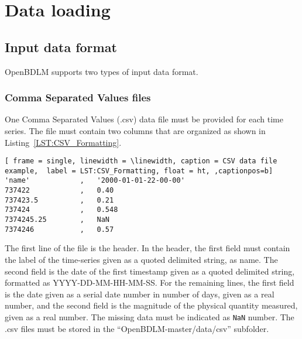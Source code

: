 \section{Data loading}
\label{S:DATALOADING}
\subsection{Input data format}

OpenBDLM supports two types of input data format.


\subsubsection{Comma Separated Values files}
\label{SS:CSVInput}

One Comma Separated Values (.csv) data file must be provided for each time series.
The file must contain two columns that are organized as shown in Listing~\ref{LST:CSV_Formatting}.
\begin{lstlisting}[ frame = single, linewidth = \linewidth, caption = CSV data file example,  label = LST:CSV_Formatting, float = ht, ,captionpos=b]
'name'            ,   '2000-01-01-22-00-00'
737422            ,   0.40
737423.5          ,   0.21
737424            ,   0.548
7374245.25        ,   NaN
7374246           ,   0.57
\end{lstlisting}    
The first line of the file is the header.
In the header, the first field must contain the label of the time-series given as a quoted delimited string, as \textquotesingle name\textquotesingle .
The second field is the date of the first timestamp given as a quoted delimited string, formatted as \textquotesingle YYYY-DD-MM-HH-MM-SS\textquotesingle.  
For the remaining lines, the first field is the date given as a serial date number in number of days, given as a real number, and the second field is the magnitude of the physical quantity measured, given as a real number.
The missing data must be indicated as \lstinline[basicstyle = \mlttfamily \small ]!NaN! number.
The .csv files must be stored in the ``OpenBDLM-master/data/csv'' subfolder.

